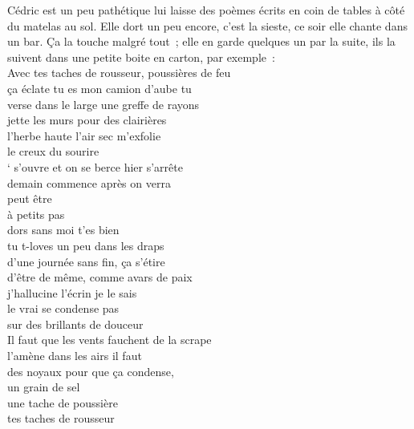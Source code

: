 Cédric est un peu pathétique lui laisse des poèmes écrits en coin de tables à
côté du matelas au sol. Elle dort un peu encore, c’est la sieste, ce soir elle
chante dans un bar. Ça la touche malgré tout ; elle en garde quelques un par la
suite, ils la suivent dans une petite boite en carton, par exemple :\\[1ex]
Avec tes taches de rousseur, poussières de feu\\
ça éclate tu es mon camion d’aube tu\\
verse dans le large une greffe de rayons\\
jette les murs pour des clairières\\
l’herbe haute l’air sec m’exfolie\\
le creux du sourire\\
‘ s’ouvre et on se berce hier s’arrête\\
demain commence après on verra\\
peut être\\
à petits pas\\
dors sans moi t’es bien\\
tu t-loves un peu dans les draps\\
d’une journée sans fin, ça s’étire \\
d’être de même, comme avars de paix \\
j’hallucine l’écrin je le sais\\
le vrai se condense pas\\
sur des brillants de douceur\\
Il faut que les vents fauchent de la scrape\\
l’amène dans les airs il faut\\
des noyaux pour que ça condense,\\
un grain de sel\\
une tache de poussière\\
tes taches de rousseur\\
